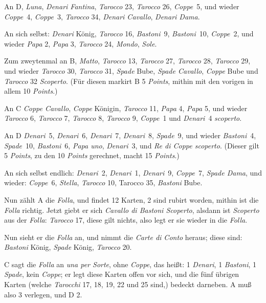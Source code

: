 \documentclass[11pt,a6paper,twoside]{article}
\begin{document}
An D, \textit{Luna}, \textit{Denari Fantina}, \textit{Tarocco} 23, \textit{Tarocco} 26, \textit{Coppe}~5, und wieder \textit{Coppe}~4, \textit{Coppe}~3, \textit{Tarocco} 34, \textit{Denari Cavallo}, \textit{Denari Dama}.

An sich selbst: \textit{Denari} König, \textit{Tarocco} 16, \textit{Bastoni}~9, \textit{Bastoni}~10, \textit{Coppe}~2, und wieder \textit{Papa} 2, \textit{Papa} 3, \textit{Tarocco} 24, \textit{Mondo}, \textit{Sole}.

Zum zweytenmal an B, \textit{Matto}, \textit{Tarocco} 13, \textit{Tarocco} 27, \textit{Tarocco} 28, \textit{Tarocco} 29, und wieder \textit{Tarocco} 30, \textit{Tarocco} 31, \textit{Spade} Bube, \textit{Spade Cavallo}, \textit{Coppe} Bube und \textit{Tarocco} 32 \textit{Scoperto}. (Für diesen markirt B 5 \textit{Points}, mithin mit den vorigen in allem 10 \textit{Points}.)

An C \textit{Coppe Cavallo}, \textit{Coppe} Königin, \textit{Tarocco} 11, \textit{Papa} 4, \textit{Papa} 5, und wieder \textit{Tarocco} 6, \textit{Tarocco} 7, \textit{Tarocco} 8, \textit{Tarocco} 9, \textit{Coppe}~1 und \textit{Denari}~4 \textit{scoperto}.

An D \textit{Denari}~5, \textit{Denari}~6, \textit{Denari}~7, \textit{Denari}~8, \textit{Spade}~9, und wieder \textit{Bastoni}~4, \textit{Spade}~10, \textit{Bastoni}~6, \textit{Papa uno}, \textit{Denari}~3, und \textit{Re di Coppe scoperto}. (Dieser gilt 5 \textit{Points}, zu den 10 \textit{Points} gerechnet, macht 15 \textit{Points}.)

An sich selbst endlich: \textit{Denari}~2, \textit{Denari}~1, \textit{Denari}~9, \textit{Coppe}~7, \textit{Spade Dama}, und wieder: \textit{Coppe}~6, \textit{Stella}, \textit{Tarocco} 10, Tarocco 35, \textit{Bastoni} Bube.

Nun zählt A die \textit{Folla}, und findet 12 Karten, 2 sind rubirt worden, mithin ist die \textit{Folla} richtig. Jetzt giebt er sich \textit{Cavallo di Bastoni Scoperto}, alsdann ist \textit{Scoperto} aus der \textit{Folla}: \textit{Tarocco} 17, diese gilt nichts, also legt er sie wieder in die \textit{Folla}.

Nun sieht er die \textit{Folla} an, und nimmt die \textit{Carte di Conto} heraus; diese sind: \textit{Bastoni} König, \textit{Spade} König, \textit{Tarocco} 20.

C sagt die \textit{Folla} an \textit{una per Sorte}, ohne \textit{Coppe}, das heißt: 1 \textit{Denari}, 1 \textit{Bastoni}, 1 \textit{Spade}, kein \textit{Coppe}; er legt diese Karten offen vor sich, und die fünf übrigen Karten (welche \textit{Tarocchi} 17, 18, 19, 22 und 25 sind,) bedeckt darneben. A muß also 3 verlegen, und D 2.
\end{document}
